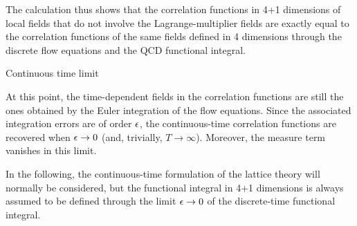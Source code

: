 The calculation thus shows that the correlation functions
in 4+1 dimensions of local fields that do not involve the 
Lagrange-multiplier fields
are exactly equal to the correlation functions
of the same fields
defined in 4 dimensions through the discrete flow 
equations and the QCD functional integral.


 Continuous time limit

At this point, the time-dependent fields in the correlation functions
are still the ones obtained by the Euler integration of the flow equations.
Since the associated
integration errors are of order $\epsilon$,
the continuous-time correlation functions are recovered 
when $\epsilon\to0$ (and, trivially, $T\to\infty$).
Moreover, the measure term
vanishes in this limit. 

In the following, the continuous-time formulation of the lattice
theory will normally be considered, but 
the functional integral in 4+1 dimensions is always assumed to be
defined through the limit $\epsilon\to0$ of
the discrete-time functional integral.
